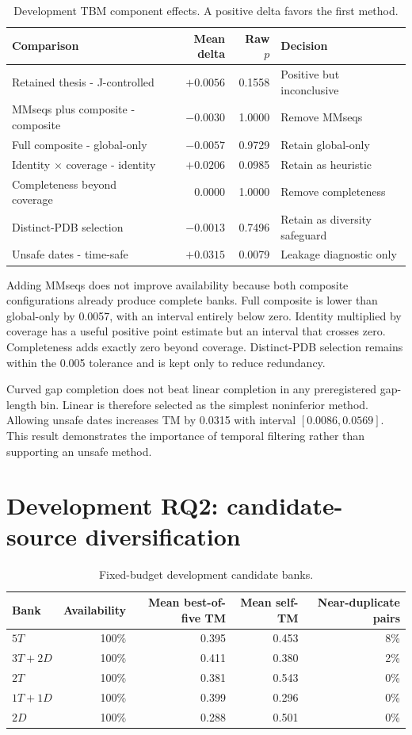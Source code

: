 \documentclass[12pt,a4paper,oneside]{report}
\begin{document}
\begin{table}[H]
\centering
\caption{Development TBM component effects. A positive delta favors the first method.}
\begin{tabularx}{\textwidth}{XrrX}
\toprule
Comparison & Mean delta & Raw $p$ & Decision \\
\midrule
Retained thesis - J-controlled & $+0.0056$ & 0.1558 & Positive but inconclusive \\
MMseqs plus composite - composite & $-0.0030$ & 1.0000 & Remove MMseqs \\
Full composite - global-only & $-0.0057$ & 0.9729 & Retain global-only \\
Identity $\times$ coverage - identity & $+0.0206$ & 0.0985 & Retain as heuristic \\
Completeness beyond coverage & 0.0000 & 1.0000 & Remove completeness \\
Distinct-PDB selection & $-0.0013$ & 0.7496 & Retain as diversity safeguard \\
Unsafe dates - time-safe & $+0.0315$ & 0.0079 & Leakage diagnostic only \\
\bottomrule
\end{tabularx}
\end{table}

Adding MMseqs does not improve availability because both composite configurations
already produce complete banks. Full composite is lower than global-only by 0.0057,
with an interval entirely below zero. Identity multiplied by coverage has a useful
positive point estimate but an interval that crosses zero. Completeness adds exactly
zero beyond coverage. Distinct-PDB selection remains within the 0.005 tolerance and is
kept only to reduce redundancy.

Curved gap completion does not beat linear completion in any preregistered gap-length
bin. Linear is therefore selected as the simplest noninferior method. Allowing unsafe
dates increases TM by 0.0315 with interval $[0.0086,0.0569]$. This result demonstrates
the importance of temporal filtering rather than supporting an unsafe method.

\section{Development RQ2: candidate-source diversification}

\begin{table}[H]
\centering
\caption{Fixed-budget development candidate banks.}
\begin{tabularx}{\textwidth}{Xrrrr}
\toprule
Bank & Availability & Mean best-of-five TM & Mean self-TM & Near-duplicate pairs \\
\midrule
$5T$ & 100\% & 0.395 & 0.453 & 8\% \\
$3T+2D$ & 100\% & 0.411 & 0.380 & 2\% \\
$2T$ & 100\% & 0.381 & 0.543 & 0\% \\
$1T+1D$ & 100\% & 0.399 & 0.296 & 0\% \\
$2D$ & 100\% & 0.288 & 0.501 & 0\% \\
\bottomrule
\end{tabularx}
\end{table}
\end{document}
